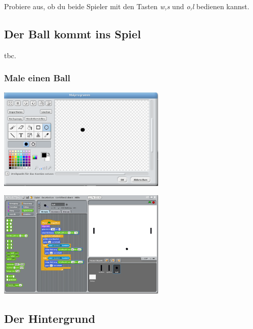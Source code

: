 Probiere aus, ob du beide Spieler mit den Tasten \emph{w,s} und \emph{o,l} bedienen kannst.

\subsection{Der Ball kommt ins Spiel}
tbc.
\subsubsection{Male einen Ball}

\includegraphics[width=0.6\textwidth]{images/aufgabe5_pong_sprite_ball_malen.png}


\includegraphics[width=0.6\textwidth]{images/aufgabe5_pong_sprite_ball_1.png}


\subsection{Der Hintergrund}

